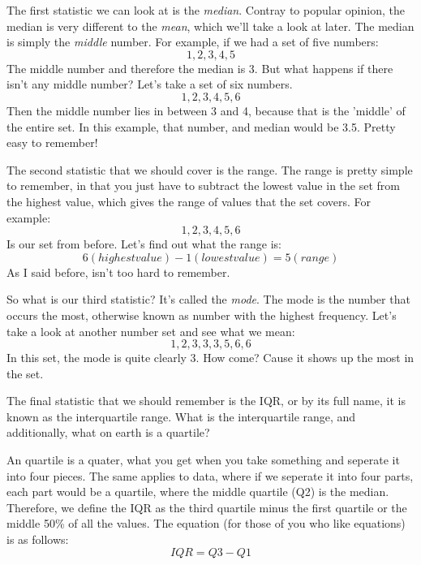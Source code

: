 \documentclass[11pt]{article}
\begin{document}
The first statistic we can look at is the \emph{median}. Contray to popular opinion, the median is very different to the \emph{mean}, which we'll take a look at later. The median is simply the \emph{middle} number. For example, if we had a set of five numbers:
\begin{displaymath}
1, 2, 3, 4, 5
\end{displaymath} 
The middle number and therefore the median is 3.
But what happens if there isn't any middle number? Let's take a set of six numbers.
\begin{displaymath}
1, 2, 3, 4, 5, 6
\end{displaymath}
Then the middle number lies in between 3 and 4, because that is the 'middle' of the entire set. In this example, that number, and median would be 3.5. Pretty easy to remember!

The second statistic that we should cover is the range. The range is pretty simple to remember, in that you just have to subtract the lowest value in the set from the highest value, which gives the range of values that the set covers. For example:
\begin{displaymath}
1, 2, 3, 4, 5, 6
\end{displaymath}
Is our set from before. Let's find out what the range is:
\begin{displaymath}
6 (highest value) - 1(lowestvalue) = 5(range)
\end{displaymath}
As I said before, isn't too hard to remember.

So what is our third statistic? It's called the \emph{mode}. The mode is the number that occurs the most, otherwise known as number with the highest frequency. Let's take a look at another number set and see what we mean:
\begin{displaymath}
1, 2, 3, 3, 3, 5, 6, 6
\end{displaymath}
In this set, the mode is quite clearly 3. How come? Cause it shows up the most in the set.

The final statistic that we should remember is the IQR, or by its full name, it is known as the interquartile range. What is the interquartile range, and additionally, what on earth is a quartile?

An quartile is a quater, what you get when you take something and seperate it into four pieces. The same applies to data, where if we seperate it into four parts, each part would be a quartile, where the middle quartile (Q2) is the median. Therefore, we define the IQR as the third quartile minus the first quartile or the middle 50\% of all the values. The equation (for those of you who like equations) is as follows:
\begin{displaymath}
IQR = Q3 - Q1
\end{displaymath}
 
\end{document}

